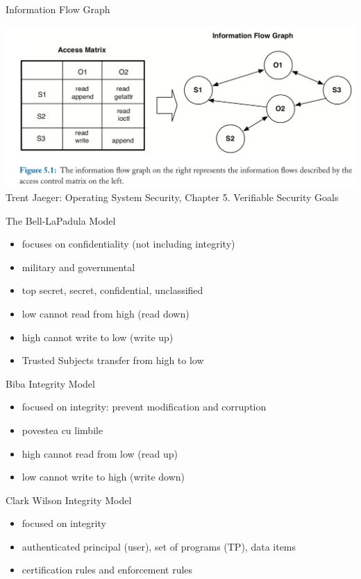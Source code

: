 \documentclass{curs}
\begin{document}
\begin{frame}{Information Flow Graph}
  \begin{center}
    \includegraphics[width=\textwidth]{img/information-flow-graph}
    \\
    Trent Jaeger: Operating System Security, Chapter 5. Verifiable Security Goals
  \end{center}
\end{frame}

\begin{frame}{The Bell-LaPadula Model}
  \begin{itemize}
    \item focuses on confidentiality (not including integrity)
    \item military and governmental
    \item top secret, secret, confidential, unclassified
    \item low cannot read from high (read down)
    \item high cannot write to low (write up)
    \item Trusted Subjects transfer from high to low
  \end{itemize}
\end{frame}

\begin{frame}{Biba Integrity Model}
  \begin{itemize}
    \item focused on integrity: prevent modification and corruption
    \item povestea cu limbile
    \item high cannot read from low (read up)
    \item low cannot write to high (write down)
  \end{itemize}
\end{frame}

\begin{frame}{Clark Wilson Integrity Model}
  \begin{itemize}
    \item focused on integrity
    \item authenticated principal (user), set of programs (TP), data items
    \item certification rules and enforcement rules
  \end{itemize}
\end{frame}
\end{document}
